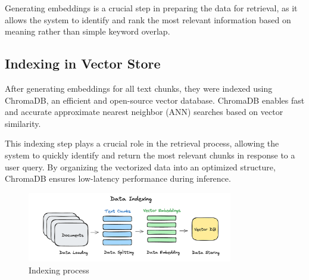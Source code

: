 Generating embeddings is a crucial step in preparing the data for retrieval, as it allows the system to identify and rank the most relevant information based on meaning rather than simple keyword overlap.

\subsection{Indexing in Vector Store}
\label{subsec:indexing}

After generating embeddings for all text chunks, they were indexed using ChromaDB, an efficient and open-source vector database. ChromaDB enables fast and accurate approximate nearest neighbor (ANN) searches based on vector similarity.

This indexing step plays a crucial role in the retrieval process, allowing the system to quickly identify and return the most relevant chunks in response to a user query. By organizing the vectorized data into an optimized structure, ChromaDB ensures low-latency performance during inference.

\begin{figure}[htbp]
  \centering
  \includegraphics[width=0.8\textwidth]{images/Indexing_RAG.png}
  \caption{Indexing process} %
  \label{fig:indexing-process-manual}
\end{figure}

